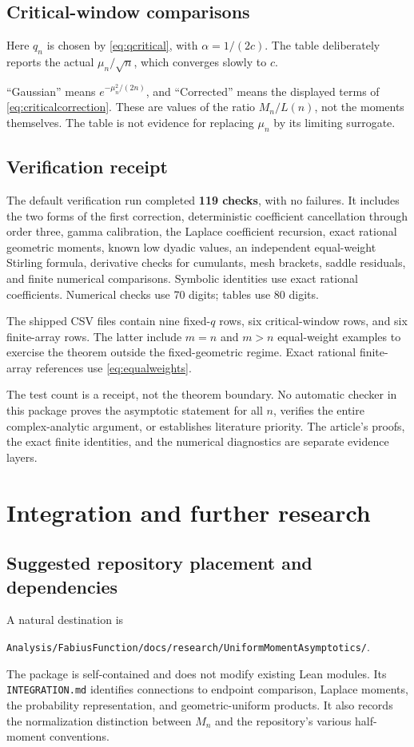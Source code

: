 \documentclass[11pt,a4paper]{article}
\numberwithin{equation}{section}
\theoremstyle{definition}\newtheorem{definition}[theorem]{Definition}
\theoremstyle{remark}\newtheorem{remark}[theorem]{Remark}
\begin{document}
\subsection{Critical-window comparisons}
Here $q_n$ is chosen by \eqref{eq:qcritical}, with $\alpha=1/(2c)$. The table deliberately reports the actual $\mu_n/\sqrt n$, which converges slowly to $c$.
\begin{center}
\small

\end{center}
``Gaussian'' means $e^{-\mu_n^2/(2n)}$, and ``Corrected'' means the displayed terms of \eqref{eq:criticalcorrection}. These are values of the ratio $M_n/L(n)$, not the moments themselves. The table is not evidence for replacing $\mu_n$ by its limiting surrogate.

\subsection{Verification receipt}
The default verification run completed \textbf{119 checks}, with no failures. It includes the two forms of the first correction, deterministic coefficient cancellation through order three, gamma calibration, the Laplace coefficient recursion, exact rational geometric moments, known low dyadic values, an independent equal-weight Stirling formula, derivative checks for cumulants, mesh brackets, saddle residuals, and finite numerical comparisons. Symbolic identities use exact rational coefficients. Numerical checks use 70 digits; tables use 80 digits.

The shipped CSV files contain nine fixed-$q$ rows, six critical-window rows, and six finite-array rows. The latter include $m=n$ and $m>n$ equal-weight examples to exercise the theorem outside the fixed-geometric regime. Exact rational finite-array references use \eqref{eq:equalweights}.

The test count is a receipt, not the theorem boundary. No automatic checker in this package proves the asymptotic statement for all $n$, verifies the entire complex-analytic argument, or establishes literature priority. The article's proofs, the exact finite identities, and the numerical diagnostics are separate evidence layers.

\section{Integration and further research}
\label{sec:future}
\subsection{Suggested repository placement and dependencies}
A natural destination is
\begin{center}
\texttt{Analysis/FabiusFunction/docs/research/UniformMomentAsymptotics/}.
\end{center}
The package is self-contained and does not modify existing Lean modules. Its \texttt{INTEGRATION.md} identifies connections to endpoint comparison, Laplace moments, the probability representation, and geometric-uniform products. It also records the normalization distinction between $M_n$ and the repository's various half-moment conventions.
\end{document}
